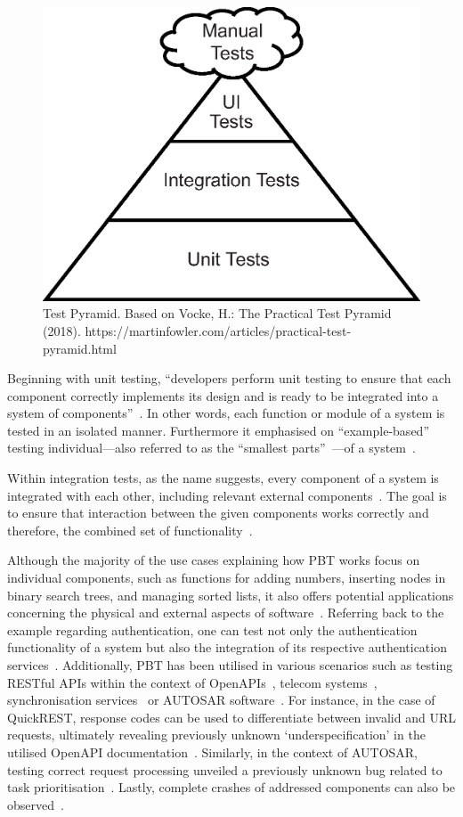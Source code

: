 \documentclass[runningheads]{llncs}
\begin{document}
\begin{figure}
  \includegraphics[width=.618\textwidth]{includes/test_pyramid.eps}
  \caption{Test Pyramid. Based on Vocke, H.: The Practical Test Pyramid (2018). https://martinfowler.com/articles/practical-test-pyramid.html}
  \label{fig:test_pyramid}
\end{figure}

Beginning with unit testing, ``developers perform unit testing to ensure that each component correctly implements its design and is ready to be integrated into a system of components''~\cite{Hartmann2000}. In other words, each function or module of a system is tested in an isolated manner. Furthermore it emphasised on ``example-based''~\cite{Corgozinho2023} testing individual---also referred to as the ``smallest parts''~\cite{Aniche2022}---of a system~\cite{Hartmann2000,Corgozinho2023}.

Within integration tests, as the name suggests, every component of a system is integrated with each other, including relevant external components~\cite{Aniche2022,Hartmann2000,Radziwill2020}. The goal is to ensure that interaction between the given components works correctly and therefore, the combined set of functionality~\cite{Hartmann2000,Aniche2022}.

Although the majority of the use cases explaining how PBT works focus on individual components, such as functions for adding numbers, inserting nodes in binary search trees,
and managing sorted lists, it also offers potential applications concerning the physical and external aspects of software~\cite{Chen2022}. Referring back to the example regarding authentication, one can test not only the authentication functionality of a system but also the integration of its respective authentication services~\cite{Fink1997}. Additionally, PBT has been utilised in various scenarios such as testing RESTful APIs within the context of OpenAPIs~\cite{Karlsson2019}, telecom systems~\cite{Arts2006}, synchronisation services~\cite{Hughes2016} or AUTOSAR software~\cite{Arts2015}. For instance, in the case of QuickREST, response codes can be used to differentiate between invalid and URL requests, ultimately revealing previously unknown `underspecification' in the utilised OpenAPI documentation~\cite{Karlsson2019}. Similarly, in the context of AUTOSAR, testing correct request processing unveiled a previously unknown bug related to task prioritisation~\cite{Arts2015}. Lastly, complete crashes of addressed components can also be observed~\cite{Arts2006}.
\end{document}
